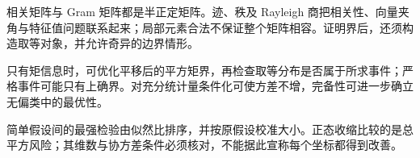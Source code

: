 相关矩阵与 Gram 矩阵都是半正定矩阵。迹、秩及 Rayleigh 商把相关性、向量夹角与特征值问题联系起来；局部元素合法不保证整个矩阵相容。证明界后，还须构造取等对象，并允许奇异的边界情形。

只有矩信息时，可优化平移后的平方矩界，再检查取等分布是否属于所求事件；严格事件可能只有上确界。对充分统计量条件化可使方差不增，完备性可进一步确立无偏类中的最优性。

简单假设间的最强检验由似然比排序，并按原假设校准大小。正态收缩比较的是总平方风险；其维数与协方差条件必须核对，不能据此宣称每个坐标都得到改善。
\par\smallskip
